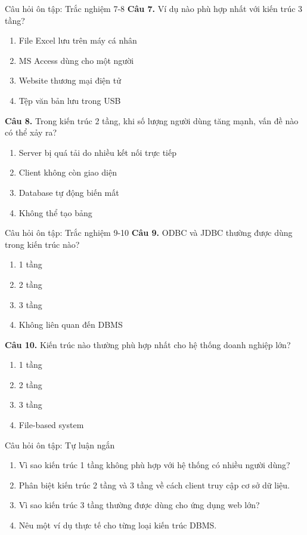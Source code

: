 \documentclass[aspectratio=169,11pt]{beamer}
\newcommand{\tightlist}{\setlength{\itemsep}{2pt}\setlength{\parskip}{0pt}}
\newcommand{\qoption}[2]{\item[#1.] #2}
\begin{document}
\begin{frame}{Câu hỏi ôn tập: Trắc nghiệm 7-8}
\small
\textbf{Câu 7.} Ví dụ nào phù hợp nhất với kiến trúc 3 tầng?
\begin{enumerate}\tightlist
  \qoption{A}{File Excel lưu trên máy cá nhân}
  \qoption{B}{MS Access dùng cho một người}
  \qoption{C}{Website thương mại điện tử}
  \qoption{D}{Tệp văn bản lưu trong USB}
\end{enumerate}

\textbf{Câu 8.} Trong kiến trúc 2 tầng, khi số lượng người dùng tăng mạnh, vấn đề nào có thể xảy ra?
\begin{enumerate}\tightlist
  \qoption{A}{Server bị quá tải do nhiều kết nối trực tiếp}
  \qoption{B}{Client không còn giao diện}
  \qoption{C}{Database tự động biến mất}
  \qoption{D}{Không thể tạo bảng}
\end{enumerate}
\end{frame}

\begin{frame}{Câu hỏi ôn tập: Trắc nghiệm 9-10}
\small
\textbf{Câu 9.} ODBC và JDBC thường được dùng trong kiến trúc nào?
\begin{enumerate}\tightlist
  \qoption{A}{1 tầng}
  \qoption{B}{2 tầng}
  \qoption{C}{3 tầng}
  \qoption{D}{Không liên quan đến DBMS}
\end{enumerate}

\textbf{Câu 10.} Kiến trúc nào thường phù hợp nhất cho hệ thống doanh nghiệp lớn?
\begin{enumerate}\tightlist
  \qoption{A}{1 tầng}
  \qoption{B}{2 tầng}
  \qoption{C}{3 tầng}
  \qoption{D}{File-based system}
\end{enumerate}
\end{frame}

\begin{frame}{Câu hỏi ôn tập: Tự luận ngắn}
\small
\begin{enumerate}\tightlist
  \item Vì sao kiến trúc 1 tầng không phù hợp với hệ thống có nhiều người dùng?
  \item Phân biệt kiến trúc 2 tầng và 3 tầng về cách client truy cập cơ sở dữ liệu.
  \item Vì sao kiến trúc 3 tầng thường được dùng cho ứng dụng web lớn?
  \item Nêu một ví dụ thực tế cho từng loại kiến trúc DBMS.
\end{enumerate}
\end{frame}
\end{document}
